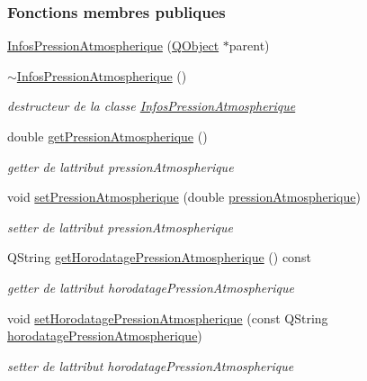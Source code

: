 \subsubsection*{Fonctions membres publiques}
\begin{DoxyCompactItemize}
\item 
\hyperlink{class_infos_pression_atmospherique_aade2e8de08264974305962bea890bf68}{Infos\+Pression\+Atmospherique} (\hyperlink{class_q_object}{Q\+Object} $\ast$parent)
\item 
\hyperlink{class_infos_pression_atmospherique_a3f4d667523391ceb3c2342c70a3ee41f}{$\sim$\+Infos\+Pression\+Atmospherique} ()
\begin{DoxyCompactList}\small\item\em destructeur de la classe \hyperlink{class_infos_pression_atmospherique}{Infos\+Pression\+Atmospherique} \end{DoxyCompactList}\item 
double \hyperlink{class_infos_pression_atmospherique_ace9906ecdd245d4d443554fcc77c76a5}{get\+Pression\+Atmospherique} ()
\begin{DoxyCompactList}\small\item\em getter de l\textquotesingle{}attribut pression\+Atmospherique \end{DoxyCompactList}\item 
void \hyperlink{class_infos_pression_atmospherique_ab598771e222fbca604ac6dba5d2aacb9}{set\+Pression\+Atmospherique} (double \hyperlink{class_infos_pression_atmospherique_a69f31dc0d0ef59f8ced23e4663ee1ab8}{pression\+Atmospherique})
\begin{DoxyCompactList}\small\item\em setter de l\textquotesingle{}attribut pression\+Atmospherique \end{DoxyCompactList}\item 
Q\+String \hyperlink{class_infos_pression_atmospherique_a6836dfc16f1be4287354ea26a080b436}{get\+Horodatage\+Pression\+Atmospherique} () const
\begin{DoxyCompactList}\small\item\em getter de l\textquotesingle{}attribut horodatage\+Pression\+Atmospherique \end{DoxyCompactList}\item 
void \hyperlink{class_infos_pression_atmospherique_a5d8ba94db66bb7bcdf5a70dd6f21de23}{set\+Horodatage\+Pression\+Atmospherique} (const Q\+String \hyperlink{class_infos_pression_atmospherique_aba207458a51a9290e4f2e0795983a44e}{horodatage\+Pression\+Atmospherique})
\begin{DoxyCompactList}\small\item\em setter de l\textquotesingle{}attribut horodatage\+Pression\+Atmospherique \end{DoxyCompactList}\end{DoxyCompactItemize}
